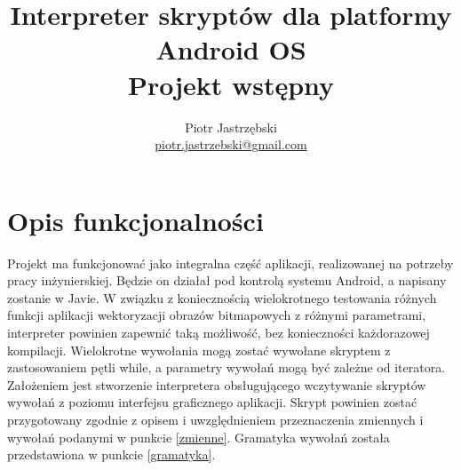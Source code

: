 \documentclass[11pt,a4paper]{article}
\title{Interpreter skryptów dla platformy Android OS\\ \large Projekt wstępny}
\author{Piotr Jastrzębski\\ \url{piotr.jastrzebski@gmail.com}}
\date{}
\begin{document}
\maketitle

\section{Opis funkcjonalności}
Projekt ma funkcjonować jako integralna część aplikacji, realizowanej na potrzeby pracy inżynierskiej. Będzie on działał pod kontrolą systemu Android, a napisany zostanie w Javie. W związku z koniecznością wielokrotnego testowania różnych funkcji aplikacji wektoryzacji obrazów bitmapowych z różnymi parametrami, interpreter powinien zapewnić taką możliwość, bez konieczności każdorazowej kompilacji. Wielokrotne wywołania mogą zostać wywołane skryptem z zastosowaniem pętli while, a parametry wywołań mogą być zależne od iteratora. Założeniem jest stworzenie interpretera obsługującego wczytywanie skryptów wywołań z poziomu interfejsu graficznego aplikacji. Skrypt powinien zostać przygotowany zgodnie z opisem i uwzględnieniem przeznaczenia zmiennych i wywołań podanymi w punkcie \ref{zmienne}. Gramatyka wywołań została przedstawiona w punkcie \ref{gramatyka}.
\end{document}
